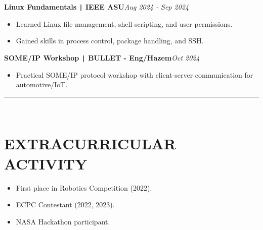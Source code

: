 \documentclass[11pt,a4paper]{article}
\begin{document}
\vspace{-0.5cm}
\begin{flushleft}
\textbf{Linux Fundamentals \texttt{|} IEEE ASU}\hfill\textit{Aug 2024 - Sep 2024}\\
\end{flushleft}
\vspace{-0.7cm}
\begin{itemize}
\item \setlength{\itemsep}{-0.0em} Learned Linux file management, shell scripting, and user permissions.
\item \setlength{\itemsep}{-0.0em} Gained skills in process control, package handling, and SSH.
\end{itemize}
\vspace{-0.5cm}
\begin{flushleft}
\textbf{SOME/IP Workshop \texttt{|} BULLET - Eng/Hazem}\hfill\textit{Oct 2024}\\
\end{flushleft}
\vspace{-0.7cm}
\begin{itemize}
\item \setlength{\itemsep}{-0.0em} Practical SOME/IP protocol workshop with client-server communication for automotive/IoT.
\end{itemize}
\vspace{-0.5cm}
\vspace{-0.1cm}
\rule{\textwidth}{0.3pt}\\
\vspace{-0.5cm}
\centering
\section*{\fontsize{14}{18}\textbf\selectfont EXTRACURRICULAR ACTIVITY}
\vspace{-0.3cm}
\begin{itemize}[noitemsep, left=0pt, itemsep=5pt]
\item First place in Robotics Competition (2022).
\item ECPC Contestant (2022, 2023).
\item NASA Hackathon participant.
\end{itemize}
\vspace{-0.6cm}
\end{document}
